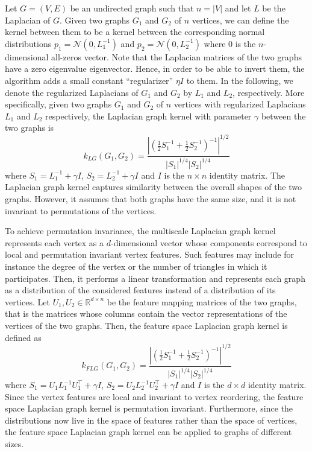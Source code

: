 \documentclass[twoside,11pt]{article}
\begin{document}
Let $G=(V,E)$ be an undirected graph such that $n = |V|$ and let $L$ be the Laplacian of $G$.
Given two graphs $G_1$ and $G_2$ of $n$ vertices, we can define the kernel between them to be a kernel between the corresponding normal distributions $p_1 = \mathcal{N}(0, L_1^{-1})$ and $p_2 = \mathcal{N}(0, L_2^{-1})$ where $0$ is the $n$-dimensional all-zeros vector.
Note that the Laplacian matrices of the two graphs have a zero eigenvalue eigenvector.
Hence, in order to be able to invert them, the algorithm adds a small constant ``regularizer'' $\eta I$ to them.
In the following, we denote the regularized Laplacians of $G_1$ and $G_2$ by $L_1$ and $L_2$, respectively.
More specifically, given two graphs $G_1$ and $G_2$ of $n$ vertices with regularized Laplacians $L_1$ and $L_2$ respectively, the Laplacian graph kernel with parameter $\gamma$ between the two graphs is
\begin{equation}
    k_{LG}(G_1, G_2) = \frac{| (\frac{1}{2} S_1^{-1} + \frac{1}{2} S_2^{-1} )^{-1} |^{1/2}}{|S_1|^{1/4} |S_2|^{1/4}} 
\end{equation}
where $S_1 = L_1^{-1} + \gamma I$, $S_2 = L_2^{-1} + \gamma I$ and $I$ is the $n \times n$ identity matrix.
The Laplacian graph kernel captures similarity between the overall shapes of the two graphs.
However, it assumes that both graphs have the same size, and it is not invariant to permutations of the vertices.

To achieve permutation invariance, the multiscale Laplacian graph kernel represents each vertex as a $d$-dimensional vector whose components correspond to local and permutation invariant vertex features.
Such features may include for instance the degree of the vertex or the number of triangles in which it participates.
Then, it performs a linear transformation and represents each graph as a distribution of the considered features instead of a distribution of its vertices.
Let $U_1, U_2 \in \mathbb{R}^{d \times n}$ be the feature mapping matrices of the two graphs, that is the matrices whose columns contain the vector representations of the vertices of the two graphs. 
Then, the feature space Laplacian graph kernel is defined as
\begin{equation}
    k_{FLG}(G_1, G_2) = \frac{| (\frac{1}{2} S_1^{-1} + \frac{1}{2} S_2^{-1} )^{-1} |^{1/2}}{|S_1|^{1/4} |S_2|^{1/4}} 
\end{equation}
where $S_1 = U_1 L_1^{-1} U_1^\top + \gamma I$, $S_2 = U_2 L_2^{-1} U_2^\top + \gamma I$ and $I$ is the $d \times d$ identity matrix.
Since the vertex features are local and invariant to vertex reordering, the feature space Laplacian graph kernel is permutation invariant.
Furthermore, since the distributions now live in the space of features rather than the space of vertices, the feature space Laplacian graph kernel can be applied to graphs of different sizes.
\end{document}
